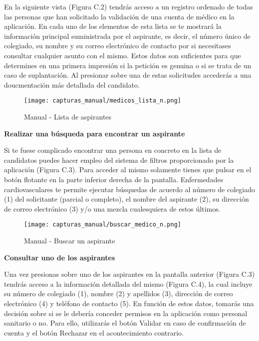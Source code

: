 \documentclass[11pt,spanish,
		listoftables,listoffigures]
		{tfgplantilla}
\begin{document}
En la siguiente vista (Figura C.2) tendrás acceso a un registro ordenado de todas las personas que han solicitado la validación de una cuenta de médico en la aplicación. En cada uno de los elementos de esta lista se te mostrará la información principal suministrada por el aspirante, es decir, el número único de colegiado, su nombre y su correo electrónico de contacto por si necesitases consultar cualquier asunto con el mismo. Estos datos son suficientes para que determines en una primera impresión si la petición es genuina o si se trata de un  caso de suplantación. Al presionar sobre una de estas solicitudes accederás a una doucmentación más detallada del candidato.

\begin{figure}[H]
\centering
\texttt{[image: capturas\_manual/medicos\_lista\_n.png]}
\caption{Manual - Lista de aspirantes}
\end{figure}

\textbf {Realizar una búsqueda para encontrar un aspirante}

Si te fuese complicado encontrar una persona en concreto en la lista de candidatos puedes hacer empleo del sistema de filtros proporcionado por la aplicación (Figura C.3). Para acceder al mismo solamente tienes que pulsar en el botón flotante en la parte inferior derecha de la pantalla. Enfermedades cardiovasculares te permite ejecutar búsquedas de acuerdo al número de colegiado (1) del solicitante (parcial o completo), el nombre del aspirante (2), su dirección de correo electrónico (3) y/o una mezcla cualesquiera de estos últimos.

\begin{figure}[H]
\centering
\texttt{[image: capturas\_manual/buscar\_medico\_n.png]}
\caption{Manual - Buscar un aspirante}
\end{figure}

\textbf {Consultar uno de los aspirantes}

Una vez presionas sobre uno de los aspirantes en la pantalla anterior (Figura C.3) tendrás acceso a la información detallada del mismo (Figura C.4), la cual incluye su número de colegiado (1), nombre (2) y apellidos (3), dirección de correo electrónico (4) y teléfono de contacto (5). En función de estos datos, tomarás una decisión sobre si se le debería conceder permisos en la aplicación como personal sanitario o no. Para ello, utilizarás el botón \textquotedbl Validar\textquotedbl{} en caso de confirmación de cuenta y el botón \textquotedbl Rechazar\textquotedbl{} en el acontecimiento contrario.
\end{document}
